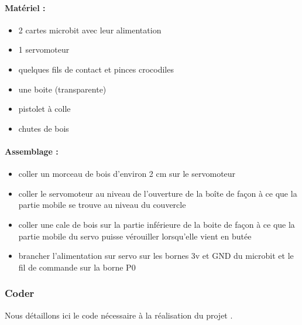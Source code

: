 \documentclass[letterpaper,10pt,french]{sphinxmanual}
\begin{document}
\paragraph{Matériel :}
\label{\detokenize{projets/boite-fermee-fabriquer:materiel}}\begin{itemize}
\item {} 
2 cartes microbit avec leur alimentation

\item {} 
1 servomoteur

\item {} 
quelques fils de contact et pinces crocodiles

\item {} 
une boite (transparente)

\item {} 
pistolet à colle

\item {} 
chutes de bois

\end{itemize}


\paragraph{Assemblage :}
\label{\detokenize{projets/boite-fermee-fabriquer:assemblage}}\begin{itemize}
\item {} 
coller un morceau de bois d’environ 2 cm sur le servomoteur

\item {} 
coller le servomoteur au niveau de l’ouverture de la boîte de façon à ce que la partie mobile se trouve au niveau du couvercle

\item {} 
coller une cale de bois sur la partie inférieure de la boite de façon à ce que la partie mobile du servo puisse vérouiller lorsqu’elle vient en butée

\item {} 
brancher l’alimentation sur servo sur les bornes 3v et GND du microbit et le fil de commande sur la borne P0

\end{itemize}

\ignorespaces 

\subsubsection{Coder}
\label{\detokenize{projets/boite-fermee-coder:index-0}}\label{\detokenize{projets/boite-fermee-coder:coder}}\label{\detokenize{projets/boite-fermee-coder::doc}}
Nous détaillons ici le code nécessaire à la réalisation
du projet {\hyperref[\detokenize{projets/boite-fermee:projetboite}]{}}.
\end{document}
